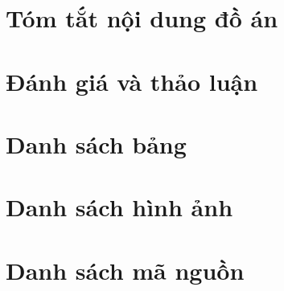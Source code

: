 \documentclass{article}
\begin{document}
% 

% 


% 

% 

\section{Tóm tắt nội dung đồ án}


\section{Đánh giá và thảo luận}


\section{Danh sách bảng}
\section{Danh sách hình ảnh}
\section{Danh sách mã nguồn}


 

\end{document}
